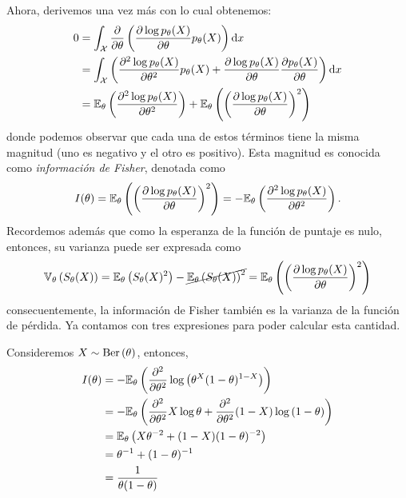Ahora, derivemos una vez más con lo cual obtenemos: 
\begin{align*}
	0 &= \int_{\mathcal X} \frac{\partial}{\partial \theta }\left(\frac{\partial \log   p_\theta(X)}{\partial\theta} p_\theta(X) \right){\text{d}x}\\ 
	&= \int_{\mathcal X} \left(\frac{\partial^2 \log   p_\theta(X)}{\partial\theta^2} p_\theta(X) + \frac{\partial \log   p_\theta(X)}{\partial\theta}\frac{\partial   p_\theta(X)}{\partial\theta}  \right){\text{d}x}\\
	&= \mathbb{E}_\theta \left(\frac{\partial^2 \log   p_\theta(X)}{\partial\theta^2}\right) + \mathbb{E}_\theta \left(\left(\frac{\partial \log   p_\theta(X)}{\partial\theta}\right)^2\right)
\end{align*}
donde podemos observar que cada una de estos términos tiene la misma magnitud (uno es negativo y el otro es positivo). Esta magnitud es conocida como \textit{información de Fisher}, denotada como 
\begin{equation}
		I(\theta) = \mathbb{E}_\theta \left(\left(\frac{\partial \log   p_\theta(X)}{\partial\theta}\right)^2\right) = 	-\mathbb{E}_\theta \left(\frac{\partial^2 \log   p_\theta(X)}{\partial\theta^2}\right).
\end{equation}	
Recordemos además que como la esperanza de la función de puntaje es nulo, entonces, su varianza puede ser expresada como 
\begin{equation}
	\mathbb{V}_\theta \left(S_\theta(X)\right) = \mathbb{E}_\theta \left(S_\theta(X)^2\right) - \cancel{\mathbb{E}_\theta \left(S_\theta(X)\right)^2} = \mathbb{E}_\theta \left(\left(\frac{\partial \log   p_\theta(X)}{\partial\theta}\right)^2\right)
\end{equation}
consecuentemente, la información de Fisher también es la varianza de la función de pérdida. Ya contamos con tres expresiones para poder calcular esta cantidad. 

\begin{exercise}
	Consideremos $X\sim\text{Ber}\left(\theta\right)$, entonces, 
	\begin{align}
		I(\theta) &= -\mathbb{E}_\theta \left(\frac{\partial^2}{\partial\theta^2}\log\left(\theta^X(1-\theta)^{1-X}\right)\right)\nonumber\\
		&= -\mathbb{E}_\theta \left(\frac{\partial^2}{\partial\theta^2} X\log\theta + \frac{\partial^2}{\partial\theta^2} 	(1-X)\log\left(1-\theta\right)	\right)\nonumber\\
		&= \mathbb{E}_\theta \left(X\theta^{-2} + (1-X)(1-\theta)^{-2}	\right)\nonumber\\
		&= \theta^{-1} + (1-\theta)^{-1}	\nonumber\\
		&= 	\frac{1}{\theta(1-\theta)}	
	\end{align}
\end{exercise}

